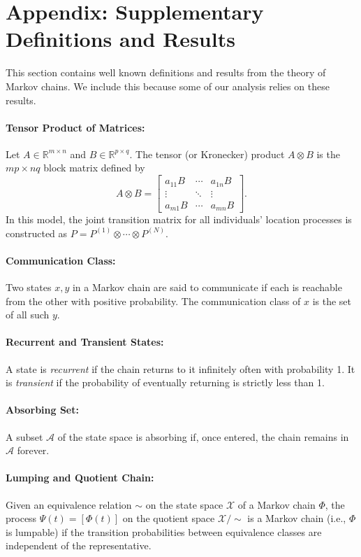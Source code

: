 \documentclass[a4paper]{article}
\begin{document}
	\appendix
	\section*{Appendix: Supplementary Definitions and Results}
	This section contains well known definitions and results from the theory of Markov chains. We include this because some of our analysis relies on these results.
	\paragraph{\textbf{Tensor Product of Matrices:}}
	Let $A \in \mathbb{R}^{m \times n}$ and $B \in \mathbb{R}^{p \times q}$. The tensor (or Kronecker) product $A \otimes B$ is the $mp \times nq$ block matrix defined by
	\[
	A \otimes B = \begin{bmatrix}
		a_{11}B & \cdots & a_{1n}B \\
		\vdots & \ddots & \vdots \\
		a_{m1}B & \cdots & a_{mn}B
	\end{bmatrix}.
	\]
	In this model, the joint transition matrix for all individuals’ location processes is constructed as $P = P^{(1)} \otimes \cdots \otimes P^{(N)}$.
	
	\paragraph{\textbf{Communication Class:}}
	Two states $x, y$ in a Markov chain are said to communicate if each is reachable from the other with positive probability. The communication class of $x$ is the set of all such $y$.
	
	\paragraph{\textbf{Recurrent and Transient States:}}
	A state is \textit{recurrent} if the chain returns to it infinitely often with probability 1. It is \textit{transient} if the probability of eventually returning is strictly less than 1.
	
	\paragraph{\textbf{Absorbing Set:}}
	A subset $\mathcal{A}$ of the state space is absorbing if, once entered, the chain remains in $\mathcal{A}$ forever.
	
	\paragraph{\textbf{Lumping and Quotient Chain:}}
	Given an equivalence relation $\sim$ on the state space $\mathcal{X}$ of a Markov chain $\Phi$, the process $\Psi(t) = [\Phi(t)]$ on the quotient space $\mathcal{X}/\sim$ is a Markov chain (i.e., $\Phi$ is lumpable) if the transition probabilities between equivalence classes are independent of the representative.
	
\end{document}
